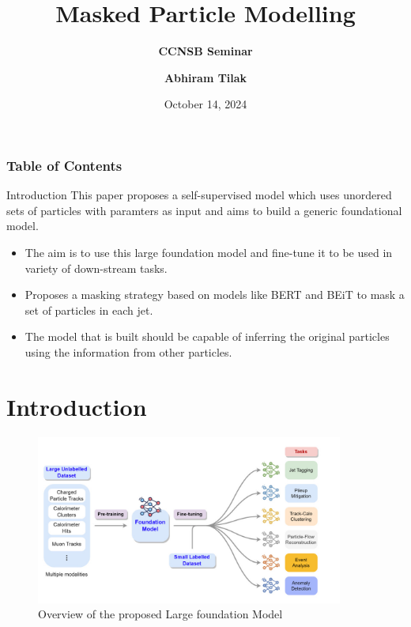 \documentclass[10pt]{beamer}
\title{Masked Particle Modelling}
\subtitle{\textbf{CCNSB Seminar}}
\author[Abhiram Tilak]
{\textbf{Abhiram Tilak}}
\institute[IIITH]
{
	\textit{	\tiny{CND Dual Degree}} \\
	\textit{IIIT Hyderabad}
}
\date{October 14, 2024}
\begin{document}
\begin{frame}
	\titlepage
\end{frame}

\begin{frame}
\frametitle{Table of Contents}
\tableofcontents
\end{frame}

\begin{frame}{Introduction}
    This paper proposes a self-supervised model which uses unordered sets of
    particles with paramters as input and aims to build a generic
    foundational model.

    \begin{itemize}[<+->]
        \item The aim is to use this large foundation model and fine-tune it to
            be used in variety of down-stream tasks.
        \item Proposes a masking strategy based on models like BERT and BEiT
            to mask a set of particles in each jet.
        \item The model that is built should be capable of inferring the
            original particles using the information from other particles.
    \end{itemize}
\end{frame}

\section{Introduction}
\begin{frame}
    \begin{figure}
        \includegraphics[width=0.9\textwidth]{intro.jpeg}
        \caption{Overview of the proposed Large foundation Model}
    \end{figure}
\end{frame}
\end{document}
